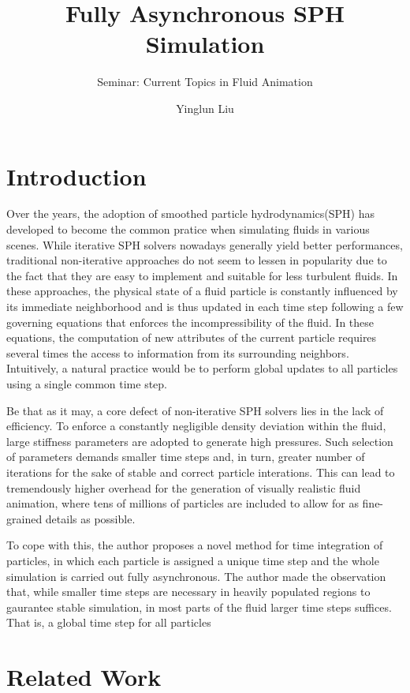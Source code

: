 \documentclass[
	11pt, 
	DIV10,
	ngerman,
	a4paper, 
	oneside, 
	headings=normal, 
	captions=tableheading,
	final, 
	numbers=noenddot
]{scrartcl}
\title{Fully Asynchronous SPH Simulation}
\subtitle{\vspace{0.5cm}Seminar: Current Topics in Fluid Animation}
\author{Yinglun Liu}
\begin{document}
\maketitle


\section{Introduction}

Over the years, the adoption of smoothed particle hydrodynamics(SPH) has developed to become the common pratice when simulating fluids in various scenes. While iterative SPH solvers nowadays generally yield better performances, traditional non-iterative approaches do not seem to lessen in popularity due to the fact that they are easy to implement and suitable for less turbulent fluids. In these approaches, the physical state of a fluid particle is constantly influenced by its immediate neighborhood and is thus updated in each time step following a few governing equations that enforces the incompressibility of the fluid. In these equations, the computation of new attributes of the current particle requires several times the access to information from its surrounding neighbors. Intuitively, a natural practice would be to perform global updates to all particles using a single common time step.
\par
Be that as it may, a core defect of non-iterative SPH solvers lies in the lack of efficiency. To enforce a constantly negligible density deviation within the fluid, large stiffness parameters are adopted to generate high pressures. Such selection of parameters demands smaller time steps and, in turn, greater number of iterations for the sake of stable and correct particle interations. This can lead to tremendously higher overhead for the generation of visually realistic fluid animation, where tens of millions of particles are included to allow for as fine-grained details as possible.
\par
To cope with this, the author proposes a novel method for time integration of particles, in which each particle is assigned a unique time step and the whole simulation is carried out fully asynchronous. The author made the observation that, while smaller time steps are necessary in heavily populated regions to gaurantee stable simulation, in most parts of the fluid larger time steps
suffices. That is, a global time step for all particles
\section{Related Work}
\end{document}
